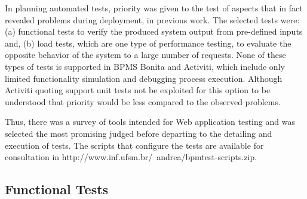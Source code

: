 \documentclass[runningheads,a4paper]{llncs}
\begin{document}
In planning automated tests, priority was given to the test of aspects that in fact revealed problems during deployment, in previous work. The selected tests were: (a) functional tests to verify the produced system output from pre-defined inputs and, (b) load tests, which are one type of performance testing, to evaluate the opposite behavior of the system to a large number of requests. None of these types of tests is supported in BPMS Bonita and Activiti, which include only limited functionality simulation and debugging process execution. Although Activiti quoting support unit tests not be exploited for this option to be understood that priority would be less compared to the observed problems.

Thus, there was a survey of tools intended for Web application testing and was selected the most promising judged before departing to the detailing and execution of tests. The scripts that configure the tests are available for consultation in http://www.inf.ufsm.br/~andrea/bpmtest-scripts.zip.

\subsection{Functional Tests}

\end{document}
